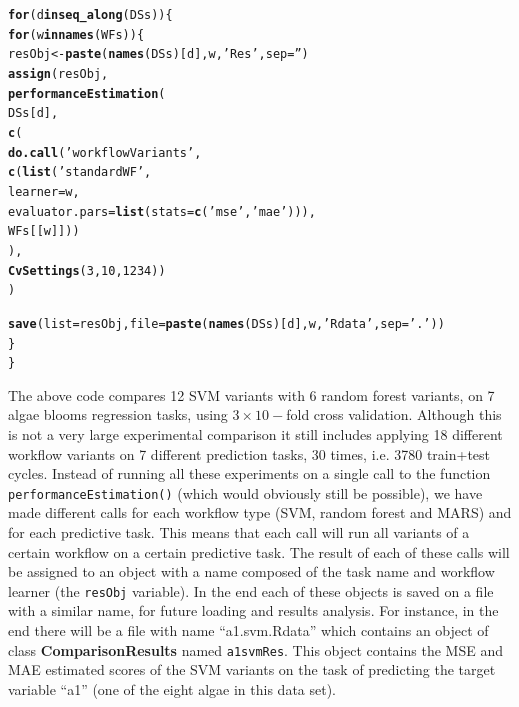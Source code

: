 \documentclass[10pt,a4paper]{article}\usepackage[]{graphicx}\usepackage[]{color}
\makeatletter
\newcommand{\hlnum}[1]{\textcolor[rgb]{0.686,0.059,0.569}{#1}}%
\newcommand{\hlstr}[1]{\textcolor[rgb]{0.192,0.494,0.8}{#1}}%
\newcommand{\hlstd}[1]{\textcolor[rgb]{0.345,0.345,0.345}{#1}}%
\newcommand{\hlkwa}[1]{\textcolor[rgb]{0.161,0.373,0.58}{\textbf{#1}}}%
\newcommand{\hlkwb}[1]{\textcolor[rgb]{0.69,0.353,0.396}{#1}}%
\newcommand{\hlkwc}[1]{\textcolor[rgb]{0.333,0.667,0.333}{#1}}%
\newcommand{\hlkwd}[1]{\textcolor[rgb]{0.737,0.353,0.396}{\textbf{#1}}}%
\newenvironment{kframe}{%
 \def\at@end@of@kframe{}%
 \ifinner\ifhmode%
  \def\at@end@of@kframe{\end{minipage}}%
  \begin{minipage}{\columnwidth}%
 \fi\fi%
 \def\FrameCommand##1{\hskip\@totalleftmargin \hskip-\fboxsep
 \colorbox{shadecolor}{##1}\hskip-\fboxsep
     \hskip-\linewidth \hskip-\@totalleftmargin \hskip\columnwidth}%
 \MakeFramed {\advance\hsize-\width
   \@totalleftmargin\z@ \linewidth\hsize
   \@setminipage}}%
 {\par\unskip\endMakeFramed%
 \at@end@of@kframe}
\newenvironment{knitrout}{}{} %
\makeatother
\begin{document}
\begin{knitrout}
\begin{kframe}
\begin{alltt}
\hlkwa{for}\hlstd{(d} \hlkwa{in} \hlkwd{seq_along}\hlstd{(DSs)) \{}
  \hlkwa{for}\hlstd{(w} \hlkwa{in} \hlkwd{names}\hlstd{(WFs)) \{}
    \hlstd{resObj} \hlkwb{<-} \hlkwd{paste}\hlstd{(}\hlkwd{names}\hlstd{(DSs)[d],w,}\hlstr{'Res'}\hlstd{,}\hlkwc{sep}\hlstd{=}\hlstr{''}\hlstd{)}
    \hlkwd{assign}\hlstd{(resObj,}
           \hlkwd{performanceEstimation}\hlstd{(}
                  \hlstd{DSs[d],}
                  \hlkwd{c}\hlstd{(}
                    \hlkwd{do.call}\hlstd{(}\hlstr{'workflowVariants'}\hlstd{,}
                            \hlkwd{c}\hlstd{(}\hlkwd{list}\hlstd{(}\hlstr{'standardWF'}\hlstd{,}
                               \hlkwc{learner}\hlstd{=w,}
                               \hlkwc{evaluator.pars}\hlstd{=}\hlkwd{list}\hlstd{(}\hlkwc{stats}\hlstd{=}\hlkwd{c}\hlstd{(}\hlstr{'mse'}\hlstd{,}\hlstr{'mae'}\hlstd{))),}
                              \hlstd{WFs[[w]]))}
                    \hlstd{),}
                   \hlkwd{CvSettings}\hlstd{(}\hlnum{3}\hlstd{,}\hlnum{10}\hlstd{,}\hlnum{1234}\hlstd{))}
           \hlstd{)}

    \hlkwd{save}\hlstd{(}\hlkwc{list}\hlstd{=resObj,}\hlkwc{file}\hlstd{=}\hlkwd{paste}\hlstd{(}\hlkwd{names}\hlstd{(DSs)[d],w,}\hlstr{'Rdata'}\hlstd{,}\hlkwc{sep}\hlstd{=}\hlstr{'.'}\hlstd{))}
  \hlstd{\}}
\hlstd{\}}
\end{alltt}
\end{kframe}
\end{knitrout}


The above code compares 12 SVM variants with 6 random forest variants, on 7 algae blooms regression tasks, using
$3\times 10-$fold cross validation. Although this is not a very large
experimental comparison it still includes applying 18 different
workflow variants on 7 different prediction tasks, 30 times, i.e. 3780
train+test cycles. Instead of running all these experiments on a
single call to the function \texttt{performanceEstimation()} (which
would obviously still be possible), we have made different calls for
each workflow type (SVM, random forest and MARS) and for each
predictive task. This means that each call will run all variants of a
certain workflow on a certain predictive task. The result of each of
these calls will be assigned to an object with a name composed of the
task name and workflow learner (the \texttt{resObj} variable). In the end each of these objects is saved
on a file with a similar name, for future loading and results
analysis. For instance, in the end there will be a file with name
``a1.svm.Rdata'' which contains an object of class \textbf{ComparisonResults}
named \texttt{a1svmRes}. This object contains the  MSE and MAE 
estimated scores of the SVM variants on the task of predicting the
target variable ``a1'' (one of the eight algae in this data set).
\end{document}
